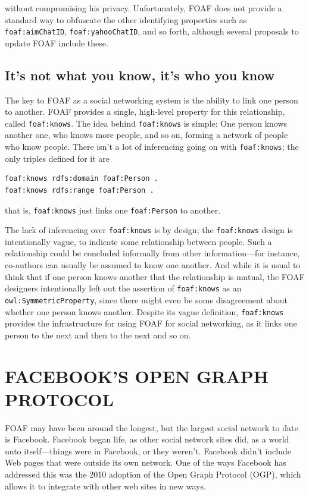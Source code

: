 without compromising his privacy. Unfortunately, FOAF does not provide a
standard way to obfuscate the other identifying properties such as
\texttt{foaf:aimChatID}, \texttt{foaf:yahooChatID}, and so forth, although several
proposals to update FOAF include these.

\subsection{It's not what you know, it's who you know}

The key to FOAF as a social networking system is the ability to link one
person to another. FOAF provides a single, high-level property for this
relationship, called \texttt{foaf:knows}. The idea behind \texttt{foaf:knows} is simple:
One person knows another one, who knows more people, and so on, forming
a network of people who know people. There isn't a lot of inferencing
going on with \texttt{foaf:knows}; the only triples defined for it are

\begin{lstlisting}
foaf:knows rdfs:domain foaf:Person . 
foaf:knows rdfs:range foaf:Person .
\end{lstlisting}

that is, \texttt{foaf:knows} just links one \texttt{foaf:Person} to another.

The lack of inferencing over \texttt{foaf:knows} is by design; the \texttt{foaf:knows}
design is intentionally vague, to indicate some relationship between
people. Such a relationship could be concluded informally from other
information---for instance, co-authors can usually be assumed to know
one another. And while it is usual to think that if one person knows
another that the relationship is mutual, the FOAF designers
intentionally left out the assertion of \texttt{foaf:knows} as an
\texttt{owl:SymmetricProperty}, since there might even be some disagreement about
whether one person knows another. Despite its vague definition,
\texttt{foaf:knows} provides the infrastructure for using FOAF for social
networking, as it links one person to the next and then to the next and
so on.

\section{FACEBOOK'S OPEN GRAPH PROTOCOL}

FOAF may have been around the longest, but the largest social network to
date is Facebook. Facebook began life, as other social network sites
did, as a world unto itself---things were in Facebook, or they weren't.
Facebook didn't include Web pages that were outside its own network. One
of the ways Facebook has addressed this was the 2010 adoption of the
Open Graph Protocol (OGP), which allows it to integrate with other web
sites in new ways.

